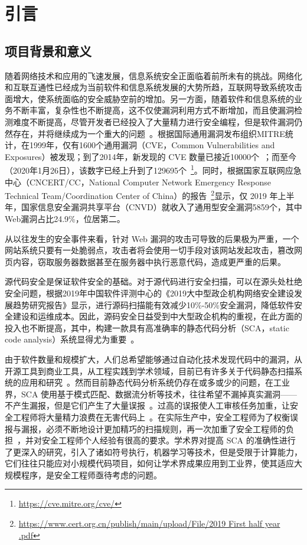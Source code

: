 \chapter{引言}

\section{项目背景和意义}
随着网络技术和应用的飞速发展，信息系统安全正面临着前所未有的挑战。网络化和互联互通性已经成为当前软件和信息系统发展的大势所趋，互联网导致系统攻击面增大，使系统面临的安全威胁空前的增加。另一方面，随着软件和信息系统的业务不断丰富，复杂性也不断提高，这不仅使漏洞利用方式不断增加，而且使漏洞检测难度不断提高，尽管开发者已经投入了大量精力进行安全编程，但是软件漏洞仍然存在，并将继续成为一个重大的问题~\cite{vuldeepecker}。根据国际通用漏洞发布组织MITRE统计，在1999年，仅有1600个通用漏洞（CVE，Common Vulnerabilities and Exposures）被发现；到了2014年，新发现的 CVE 数量已接近10000个~\cite{liujian2018}；而至今（2020年1月26日），该数字已经上升到了129695个~\footnote{\url{https://cve.mitre.org/cve/}}。同时，根据国家互联网应急中心（CNCERT/CC，National Computer Network Emergency Response Technical Team/Coordination Center of China）的报告~\footnote{\url{https://www.cert.org.cn/publish/main/upload/File/2019 First half year .pdf}}显示，仅 2019 年上半年，国家信息安全漏洞共享平台（CNVD）就收入了通用型安全漏洞5859个，其中Web漏洞占比24.9\%，位居第二。

从以往发生的安全事件来看，针对 Web 漏洞的攻击可导致的后果极为严重，一个网站系统只要有一处脆弱点，攻击者将会使用一切手段对该网站发起攻击，篡改网页内容，窃取服务器数据甚至在服务器中执行恶意代码，造成更严重的后果。

源代码安全是保证软件安全的基础。对于源代码进行安全扫描，可以在源头处杜绝安全问题，根据2019年中国软件评测中心的《2019大中型政企机构网络安全建设发展趋势研究报告》显示，进行源码扫描能有效减少10\%-50\%安全漏洞，降低软件安全建设和运维成本。因此，源码安全日益受到中大型政企机构的重视，在此方面的投入也不断提高，其中，构建一款具有高准确率的静态代码分析（SCA，static code analysis）系统显得尤为重要~\cite{aletheia}。

由于软件数量和规模扩大，人们总希望能够通过自动化技术发现代码中的漏洞，从开源工具到商业工具，从工程实践到学术领域，目前已有许多关于代码静态扫描系统的应用和研究~\cite{li2016vulpecker,leopard,sym:exe,taint:finding,vuldeepecker,taint:taj,Koc2019,sym:cute,atp:saturn,sym:klee,atp:escjava,Koc2017,pixy,aletheia}。然而目前静态代码分析系统仍存在或多或少的问题，在工业界，SCA 使用基于模式匹配、数据流分析等技术，往往希望不漏掉真实漏洞——不产生漏报，但是它们产生了大量误报~\cite{falseAlarm,aletheia,falsepositive}。过高的误报使人工审核任务加重，让安全工程师将大量精力浪费在无害代码上~\cite{leopard}。在实际生产中，安全工程师为了权衡误报与漏报，必须不断地设计更加精巧的扫描规则，再一次加重了安全工程师的负担~\cite{taintStyle,vuldeepecker}，并对安全工程师个人经验有很高的要求。学术界对提高 SCA 的准确性进行了更深入的研究，引入了诸如符号执行，机器学习等技术，但是受限于计算能力，它们往往只能应对小规模代码项目，如何让学术界成果应用到工业界，使其适应大规模程序，是安全工程师亟待考虑的问题。

